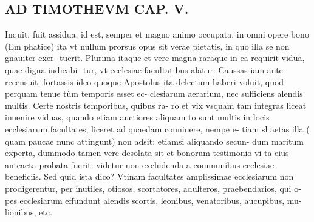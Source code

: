 \documentclass{article}
\begin{document}
\begin{pages}
\section*{AD TIMOTHEVM CAP. V. }
\marginpar{[ p.109 ]}\pstart Inquit, fuit assidua, id est, semper et magno animo occupata, in omni opere bono (Em phatice) ita vt nullum prorsus opus sit verae pietatis, in quo illa se non gnauiter exer- tuerit. Plurima itaque et vere magna raraque in ea requirit vidua, quae digna iudicabi- tur, vt ecclesiae facultatibus alatur: Caussas iam ante recensuit: fortassis ideo quoque Apostolus ita delectum haberi voluit, quod perquam tenue tùm temporis esset ec- clesiarum aerarium, nec sufficiens alendis multis. Certe nostris temporibus, quibus ra- ro et vix vsquam tam integras liceat inuenire viduas, quando etiam auctiores aliquam to sunt multis in locis ecclesiarum facultates, liceret ad quaedam conniuere, nempe e- tiam sl aetas illa ( quam paucae nunc attingunt) non adsit: etiamsi aliquando secun- dum maritum experta, dummodo tamen vere desolata sit et bonorum testimonio vi ta eius anteacta probata fuerit: videtur non excludenda a communibus ecclesiae beneficiis. Sed quid ista dico? Vtinam facultates amplissimae ecclesiarum non prodigerentur, per inutiles, otiosos, scortatores, adulteros, praebendarios, qui o- pes ecclesiarum effundunt alendis scortis, leonibus, venatoribus, aucupibus, mu- lionibus, etc.  \pend
{}
{}

\end{pages}
\end{document}
